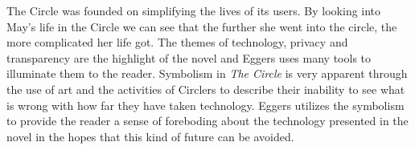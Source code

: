 The Circle was founded on simplifying the lives of its users.
By looking into May's life in the Circle we can see that the further she went into the circle, the more complicated her life got.
The themes of technology, privacy and transparency are the highlight of the novel and Eggers uses many tools to illuminate them to the reader.
Symbolism in \textit{The Circle} is very apparent through the use of art and the activities of Circlers to describe their inability to see what is wrong with how far they have taken technology.
Eggers utilizes the symbolism to provide the reader a sense of foreboding about the technology presented in the novel in the hopes that this kind of future can be avoided.